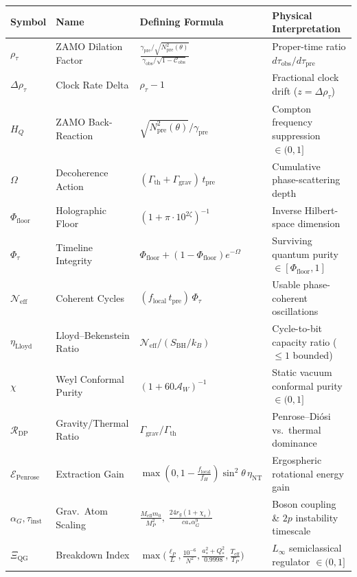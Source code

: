 \documentclass[11pt,a4paper]{article}
\begin{document}
\begin{table}[h!]
\centering
\small
\begin{tabular}{@{}llll@{}}
\toprule
\textbf{Symbol} & \textbf{Name} & \textbf{Defining Formula} & \textbf{Physical Interpretation} \\
\midrule
$\rho_\tau$ & ZAMO Dilation Factor & $\frac{\gamma_{\mathrm{pre}}/\sqrt{N^2_{\mathrm{pre}}(\theta)}}{\gamma_{\mathrm{obs}}/\sqrt{1-\mathcal{C}_{\mathrm{obs}}}}$ & Proper-time ratio $d\tau_{\mathrm{obs}} / d\tau_{\mathrm{pre}}$ \\
$\Delta\rho_\tau$ & Clock Rate Delta & $\rho_\tau - 1$ & Fractional clock drift ($z = \Delta\rho_\tau$) \\
$H_Q$ & ZAMO Back-Reaction & $\sqrt{N^2_{\mathrm{pre}}(\theta)} / \gamma_{\mathrm{pre}}$ & Compton frequency suppression $\in (0,1]$ \\
$\Omega$ & Decoherence Action & $(\Gamma_{\mathrm{th}} + \Gamma_{\mathrm{grav}})\,t_{\mathrm{pre}}$ & Cumulative phase-scattering depth \\
$\Phi_{\mathrm{floor}}$ & Holographic Floor & $(1 + \pi \cdot 10^{2\zeta})^{-1}$ & Inverse Hilbert-space dimension \\
$\Phi_\tau$ & Timeline Integrity & $\Phi_{\mathrm{floor}} + (1 - \Phi_{\mathrm{floor}})e^{-\Omega}$ & Surviving quantum purity $\in [\Phi_{\mathrm{floor}}, 1]$ \\
$\mathcal{N}_{\mathrm{eff}}$ & Coherent Cycles & $(f_{\mathrm{local}}\,t_{\mathrm{pre}})\,\Phi_\tau$ & Usable phase-coherent oscillations \\
$\eta_{\mathrm{Lloyd}}$ & Lloyd--Bekenstein Ratio & $\mathcal{N}_{\mathrm{eff}} / (S_{\mathrm{BH}}/k_B)$ & Cycle-to-bit capacity ratio ($\le 1$ bounded) \\
$\chi$ & Weyl Conformal Purity & $(1 + 60\mathcal{A}_W)^{-1}$ & Static vacuum conformal purity $\in (0,1]$ \\
$\mathcal{R}_{\mathrm{DP}}$ & Gravity/Thermal Ratio & $\Gamma_{\mathrm{grav}} / \Gamma_{\mathrm{th}}$ & Penrose--Di\'osi vs.\ thermal dominance \\
$\mathcal{E}_{\mathrm{Penrose}}$ & Extraction Gain & $\max(0, 1 - \frac{f_{\mathrm{local}}}{f_H})\sin^2\theta\,\eta_{\mathrm{NT}}$ & Ergospheric rotational energy gain \\
$\alpha_G, \tau_{\mathrm{inst}}$ & Grav.\ Atom Scaling & $\frac{M_{\mathrm{eff}} m_0}{M_P^2},\; \frac{24 r_g(1+\chi_s)}{c a_* \alpha_G^9}$ & Boson coupling \& $2p$ instability timescale \\
$\Xi_{\mathrm{QG}}$ & Breakdown Index & $\max\big(\frac{\ell_P}{L}, \frac{10^{-6}}{N^2}, \frac{a_*^2+Q_*^2}{0.9998}, \frac{T_{\mathrm{eff}}}{T_P}\big)$ & $L_\infty$ semiclassical regulator $\in (0,1]$ \\
\bottomrule
\end{tabular}
\end{table}
\end{document}
